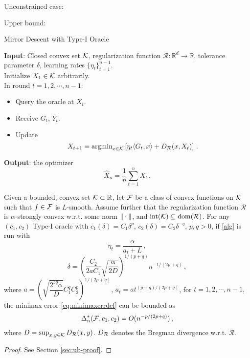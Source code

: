 
Unconstrained case:

Upper bound: 

\begin{algorithm}
	\caption{Mirror Descent with Type-I Oracle}\label{alg}
	\textbf{Input}: Closed convex set $\mathcal{K}$, regularization function $\mathcal{R}:\mathbb{R}^d\to \mathbb{R}$, tolerance parameter $\delta$, learning rates $\{\eta_t\}_{t=1}^{n-1}$. \\
	Initialize $X_1\in \mathcal{K}$ arbitrarily.\\
	In round $t=1, 2, \cdots, n-1$:
	\begin{itemize}
	\item Query the oracle at $X_t$.
	\item Receive $G_t$, $Y_t$.
	\item Update
	\[
	X_{t+1}=\operatorname{argmin}_{x\in \mathcal{K}}\left[ \eta_{t} \langle G_t,x \rangle+D_{\mathcal{R}}(x,X_t) \right] \,.
	\]
	\end{itemize}
	\textbf{Output}: the optimizer
	\[
	\hat{X}_n = \dfrac{1}{n}\sum_{t=1}^n X_t \,.
	\]
	
\end{algorithm}

\begin{theorem}
\label{thm:ub}
Given a bounded, convex set $\mathcal{K} \subset \mathbb{R}$,
let $\mathcal{F}$ be a class of convex functions on $\mathcal{K}$ such that $f \in \mathcal{F}$ is $L$-smooth.
Assume further that the regularization function $\mathcal{R}$ is $\alpha$-strongly convex w.r.t. some norm $\|\cdot\|$, and $\operatorname{int}(\mathcal{K})\subseteq \operatorname{dom}(\mathcal{R})$.
For any $(c_1,c_2)$ Type-I oracle 
 with $c_1(\delta) = C_1 \delta^p$, $c_2(\delta) = C_2 \delta^{-q}$, $p,q>0$, 
 if \cref{alg} is run with 
 \[
 \eta_t = \dfrac{\alpha}{a_t+L} \,,
 \]
 \[
 \delta = \left( \dfrac{C_2}{2aC_1}\sqrt{\dfrac{\alpha}{2D}} \right)^{1/(p+q)}n^{-1/(2p+q)} \,,
 \]
 where
 $a = \left( \sqrt{\dfrac{2^{3q}\alpha}{D}}C_1^q C_2^p \right)^{1/(2p+q)}$,
 $a_t = a t^{(p+q)/(2p+q)}$, for $t=1, 2, \cdots, n-1$,
  the minimax error \eqref{eq:minimaxerrdef} can be bounded as
 \begin{align*}
\Delta_n^*(\mathcal{F},c_1,c_2)= O(n^{-p/(2p+q)})\,,
 \end{align*}
 where $D=\sup_{x,y\in \mathcal{K}} D_{\mathcal{R}}(x,y)$. $D_{\mathcal{R}}$ denotes the Bregman divergence w.r.t. $\mathcal{R}$.
\end{theorem}
\begin{proof}
See Section \ref{sec:ub-proof}.
\end{proof}


